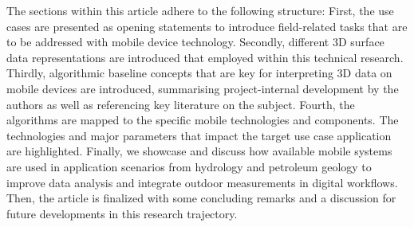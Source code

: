 \documentclass[review]{elsarticle}
\begin{document}

The sections within this article adhere to the following structure: First, the use cases are presented as opening statements to introduce field-related tasks that are to be addressed with mobile device technology. Secondly, different 3D surface data representations are introduced that employed within this technical research. Thirdly, algorithmic baseline concepts that are key for interpreting 3D data on mobile devices are introduced, summarising project-internal development by the authors as well as referencing key literature on the subject. Fourth, the algorithms are mapped to the specific mobile technologies and components. The technologies and major parameters that impact the target use case application are highlighted. Finally, we showcase and discuss how available mobile systems are used in application scenarios from hydrology and petroleum geology to improve data analysis and integrate outdoor measurements in digital workflows. Then, the article is finalized with some concluding remarks and a discussion for future developments in this research trajectory.

\end{document}
